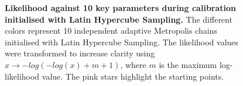 \begin{figure}[ht]
    \caption{\textbf{  
	Likelihood against 10 key parameters during calibration initialised with Latin Hypercube Sampling.    
    } 
The different colors represent 10 independent adaptive Metropolis chains initialised with Latin Hypercube Sampling. The likelihood values were transformed to increase clarity using $x \rightarrow -log(-log(x) + m + 1)$, where $m$ is the maximum log-likelihood value. The pink stars highlight the starting points.     
    }
    \label{fig:lhs_experiments_likelihood}
\end{figure}


